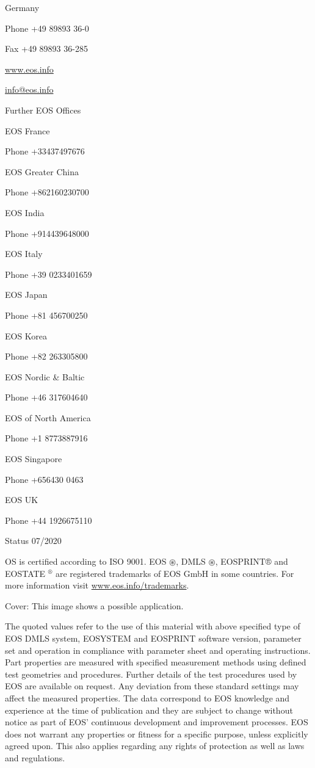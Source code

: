 \documentclass[10pt]{article}
\begin{document}
Germany

Phone +49 89893 36-0

Fax +49 89893 36-285

\href{http://www.eos.info}{www.eos.info}

\href{mailto:info@eos.info}{info@eos.info}

Further EOS Offices

EOS France

Phone +33437497676

EOS Greater China

Phone +862160230700

EOS India

Phone +914439648000

EOS Italy

Phone +39 0233401659

EOS Japan

Phone +81 456700250

EOS Korea

Phone +82 263305800

EOS Nordic \& Baltic

Phone +46 317604640

EOS of North America

Phone +1 8773887916

EOS Singapore

Phone +656430 0463

EOS UK

Phone +44 1926675110

Status 07/2020

OS is certified according to ISO 9001. EOS $\circledast$, DMLS $\circledast$, EOSPRINT® and EOSTATE ${ }^{\circledR}$ are registered trademarks of EOS GmbH in some countries. For more information visit \href{http://www.eos.info/trademarks}{www.eos.info/trademarks}.

Cover: This image shows a possible application.

The quoted values refer to the use of this material with above specified type of EOS DMLS system, EOSYSTEM and EOSPRINT software version, parameter set and operation in compliance with parameter sheet and operating instructions. Part properties are measured with specified measurement methods using defined test geometries and procedures. Further details of the test procedures used by EOS are available on request. Any deviation from these standard settings may affect the measured properties. The data correspond to EOS knowledge and experience at the time of publication and they are subject to change without notice as part of EOS' continuous development and improvement processes. EOS does not warrant any properties or fitness for a specific purpose, unless explicitly agreed upon. This also applies regarding any rights of protection as well as laws and regulations.
\end{document}
